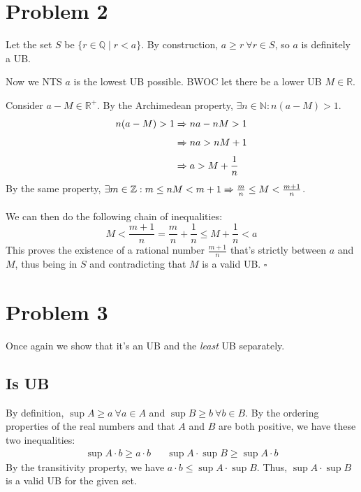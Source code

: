 \documentclass[12pt]{article}
\newcommand{\ra}{\xRightarrow}
\newcommand{\R}{\mathbb{R}}
\newcommand{\Q}{\mathbb{Q}}
\begin{document}
\pagebreak

\section{Problem 2}\label{sec:prob2}

Let the set $S$ be $\{r \in \Q \mid r < a\}$.
By construction, $a \ge r\ \forall r \in S$, so $a$ is definitely a UB.

Now we NTS $a$ is the lowest UB possible.
BWOC let there be a lower UB $M \in \R$.

Consider $a-M \in \R^+$.
By the Archimedean property, $\exists n \in \mathbb{N}: n(a-M)>1$.
\begin{align*}
  n(a-M)>1 & \ra{} na-nM>1         \\
           & \ra{} na>nM+1         \\
           & \ra{} a>M+\frac{1}{n}
\end{align*}
By the same property, $\exists m \in \mathbb{Z}: m \le nM < m+1 \ra{} \frac{m}{n} \le M < \frac{m+1}{n}$.

We can then do the following chain of inequalities:
\[M < \frac{m+1}{n}=\frac{m}{n}+\frac{1}{n} \le M + \frac{1}{n} < a \]
This proves the existence of a rational number $\frac{m+1}{n}$ that's
strictly between $a$ and $M$, thus being in $S$ and contradicting
that $M$ is a valid UB. $\square$

\pagebreak

\section{Problem 3}\label{sec:prob3}

Once again we show that it's an UB and the \textit{least} UB separately.

\subsection{Is UB}

By definition, $\sup A \ge a \ \forall a \in A$ and $\sup B \ge b\ \forall b \in B$.
By the ordering properties of the real numbers and that $A$ and $B$ are both positive,
we have these two inequalities:
\begin{align*}
  \sup A \cdot b \ge a \cdot b &  & \sup A \cdot \sup B \ge \sup A \cdot b
\end{align*}
By the transitivity property, we have $a \cdot b \le \sup A \cdot \sup B$.
Thus, $\sup A \cdot \sup B$ is a valid UB for the given set.
\end{document}
